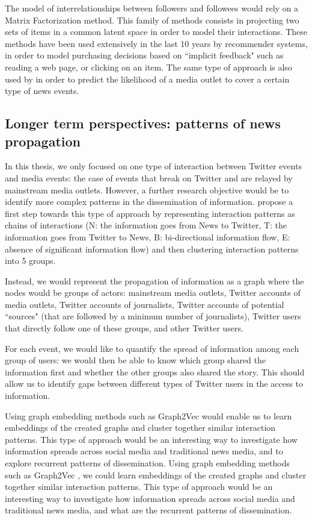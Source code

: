 The model of interrelationships between followers and followees would rely on a Matrix Factorization method. This family of methods consists in projecting two sets of items in a common latent space in order to model their interactions. These methods have been used extensively in the last 10 years by recommender systems, in order to model purchasing decisions based on ``implicit feedback" \citep{hu2008collaborative} such as reading a web page, or clicking on an item. The same type of approach is also used by \cite{rappaz2019dynamic} in order to predict the likelihood of a media outlet to cover a certain type of news events.

\subsection{Longer term perspectives: patterns of news propagation}

In this thesis, we only focused on one type of interaction between Twitter events and media events: the case of events that break on Twitter and are relayed by mainstream media outlets. However, a further research objective would be to identify more complex patterns in the dissemination of information. \cite{ning_uncovering_2015} propose a first step towards this type of approach by representing interaction patterns as chains of interactions (N: the information goes from News to Twitter, T: the information goes from Twitter to News, B: bi-directional information flow, E: absence of significant information flow) and then clustering interaction patterns into 5 groups.

Instead, we would represent the propagation of information as a graph where the nodes would be groups of actors: mainstream media outlets, Twitter accounts of media outlets, Twitter accounts of journalists, Twitter accounts of potential ``sources" (that are followed by a minimum number of journalists), Twitter users that directly follow one of these groups, and other Twitter users.

For each event, we would like to quantify the spread of information among each group of users: we would then be able to know which group shared the information first and whether the other groups also shared the story. This should allow us to identify gaps between different types of Twitter users in the access to information.

Using graph embedding methods such as Graph2Vec \citep{narayanan2017graph2vec} would enable us to learn embeddings of the created graphs and cluster together similar interaction patterns. This type of approach would be an interesting way to investigate how information spreads across social media and traditional news media, and to explore recurrent patterns of dissemination. Using graph embedding methods such as Graph2Vec \citep{narayanan2017graph2vec}, we could learn embeddings of the created graphs and cluster together similar interaction patterns. This type of approach would be an interesting way to investigate how information spreads across social media and traditional news media, and what are the recurrent patterns of dissemination.

